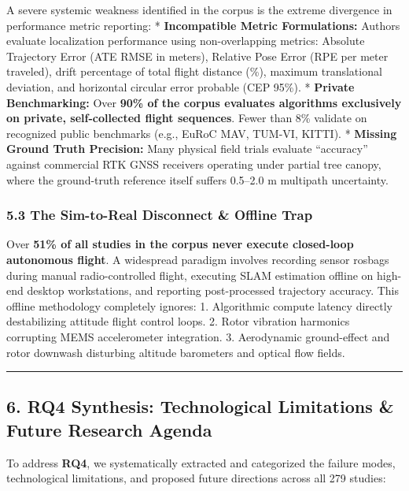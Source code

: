 \documentclass[journal]{IEEEtran}
\begin{document}
A severe systemic weakness identified in the corpus is the extreme
divergence in performance metric reporting: * \textbf{Incompatible
Metric Formulations:} Authors evaluate localization performance using
non-overlapping metrics: Absolute Trajectory Error (ATE RMSE in meters),
Relative Pose Error (RPE per meter traveled), drift percentage of total
flight distance (\%), maximum translational deviation, and horizontal
circular error probable (CEP 95\%). * \textbf{Private Benchmarking:}
Over \textbf{90\% of the corpus evaluates algorithms exclusively on
private, self-collected flight sequences}. Fewer than 8\% validate on
recognized public benchmarks (e.g., EuRoC MAV, TUM-VI, KITTI). *
\textbf{Missing Ground Truth Precision:} Many physical field trials
evaluate ``accuracy'' against commercial RTK GNSS receivers operating
under partial tree canopy, where the ground-truth reference itself
suffers 0.5--2.0 m multipath uncertainty.

\subsubsection{5.3 The Sim-to-Real Disconnect \& Offline
Trap}\label{the-sim-to-real-disconnect-offline-trap}

Over \textbf{51\% of all studies in the corpus never execute closed-loop
autonomous flight}. A widespread paradigm involves recording sensor
rosbags during manual radio-controlled flight, executing SLAM estimation
offline on high-end desktop workstations, and reporting post-processed
trajectory accuracy. This offline methodology completely ignores: 1.
Algorithmic compute latency directly destabilizing attitude flight
control loops. 2. Rotor vibration harmonics corrupting MEMS
accelerometer integration. 3. Aerodynamic ground-effect and rotor
downwash disturbing altitude barometers and optical flow fields.

\begin{center}\rule{0.5\linewidth}{0.5pt}\end{center}

\subsection{6. RQ4 Synthesis: Technological Limitations \& Future
Research
Agenda}\label{rq4-synthesis-technological-limitations-future-research-agenda}

To address \textbf{RQ4}, we systematically extracted and categorized the
failure modes, technological limitations, and proposed future directions
across all 279 studies:
\end{document}
